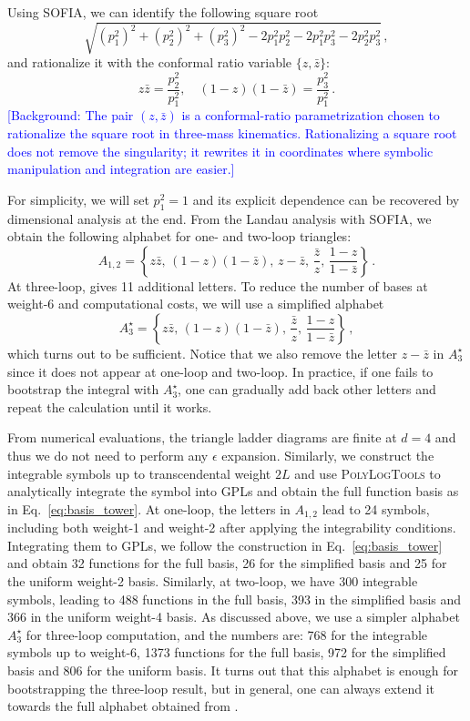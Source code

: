 \documentclass[a4paper,11pt]{article}
\begin{document}
Using \textsc{SOFIA}, we can identify the following square root
\begin{equation*}
    \sqrt{(p_1^2)^2+(p_2^2)^2+(p_3^2)^2-2p_1^2p_2^2-2p_1^2p_3^2-2p_2^2p_3^2}\,,
\end{equation*}
and rationalize it with the conformal ratio variable $\{z,\bar z\}$:
\begin{equation}
    z\bar z = \frac{p_2^2}{p_1^2},\quad (1-z)(1-\bar z) = \frac{p_3^2}{p_1^2}\,.
\end{equation}
\textcolor{blue}{\small [Background: The pair $(z,\bar z)$ is a conformal-ratio parametrization chosen to rationalize the square root in three-mass kinematics. Rationalizing a square root does not remove the singularity; it rewrites it in coordinates where symbolic manipulation and integration are easier.]}

For simplicity, we will set $p_1^2=1$ and its explicit dependence can be recovered by dimensional analysis at the end. From the Landau analysis with \textsc{SOFIA}, we obtain the following alphabet for one- and two-loop triangles:
\begin{equation}
    A_{1,2}=\left\{z\bar z,\, (1-z)(1-\bar z),\, z-\bar z,\, \frac{\bar z}{z},\, \frac{1-z}{1-\bar z} \right\}\,.
\end{equation}
At three-loop,  gives 11 additional letters. To reduce the number of bases at weight-6 and computational costs, we will use a simplified alphabet \begin{equation}
    A_{3}^\star =\left\{z\bar z,\, (1-z)(1-\bar z),\, \frac{\bar z}{z},\, \frac{1-z}{1-\bar z} \right\}\,,
\end{equation} 
which turns out to be sufficient. Notice that we also remove the letter $z-\bar z$ in $A_3^\star$ since it does not appear at one-loop and two-loop. In practice, if one fails to bootstrap the integral with $A_3^\star$, one can gradually add back other letters and repeat the calculation until it works. 

From numerical evaluations, the triangle ladder diagrams are finite at $d=4$ and thus we do not need to perform any $\epsilon$ expansion. Similarly, we construct the integrable symbols up to transcendental weight $2L$ and use \textsc{PolyLogTools} to analytically integrate the symbol into GPLs and obtain the full function basis as in Eq.~\eqref{eq:basis_tower}. At one-loop, the letters in $A_{1,2}$ lead to 24 symbols, including both weight-1 and weight-2 after applying the integrability conditions. Integrating them to GPLs, we follow the construction in Eq.~\eqref{eq:basis_tower} and obtain 32 functions for the full basis, 26 for the simplified basis and 25 for the uniform weight-2 basis. Similarly, at two-loop, we have 300 integrable symbols, leading to 488 functions in the full basis, 393 in the simplified basis and 366 in the uniform weight-4 basis. As discussed above, we use a simpler alphabet $A_3^\star$ for three-loop computation, and the numbers are: 768 for the integrable symbols up to weight-6, 1373 functions for the full basis, 972 for the simplified basis and 806 for the uniform basis. It turns out that this alphabet is enough for bootstrapping the three-loop result, but in general, one can always extend it towards the full alphabet obtained from .
\end{document}
